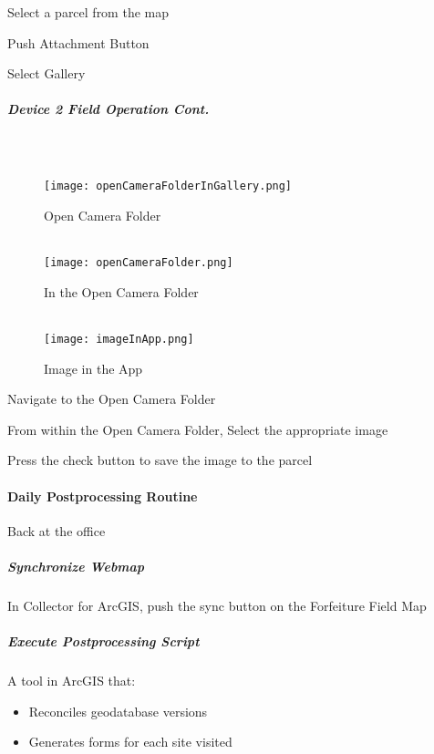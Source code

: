 \documentclass[class=article , crop=false, titlepage, twoside, multi={itemize, figure, verbatim}, float=false]{standalone}
\begin{document}
Select a parcel from the map\\
\vspace{2in}

\noindent Push Attachment Button
\vspace{2in}

\noindent Select Gallery

\clearpage
\subparagraph*{Device 2 Field Operation Cont.} 
\subparagraph*{\\}

\begin{wrapfigure}{r}{0.5\textwidth}
\centering
\texttt{[image: openCameraFolderInGallery.png]}
\caption {Open Camera Folder}
\vspace{.2in}
\HRule \\[.4cm] %
\vspace{.2in}
\texttt{[image: openCameraFolder.png]}
\caption{In the Open Camera Folder}
\vspace{.2in}
\HRule \\[.4cm] %
\vspace{.2in}
\texttt{[image: imageInApp.png]}
\caption{Image in the App}
\end{wrapfigure}
Navigate to the Open Camera Folder\\
\vspace{2in}

\noindent From within the Open Camera Folder, Select the appropriate image
\vspace{2in}

\noindent Press the check button to save the image to the parcel 

\clearpage
\paragraph{Daily Postprocessing Routine}Back at the office
\subparagraph{Synchronize Webmap}In Collector for ArcGIS, push the sync button on the Forfeiture Field Map
\subparagraph{Execute Postprocessing Script}A tool in ArcGIS that:

\begin{itemize}
\item Reconciles geodatabase versions
\item Generates forms for each site visited


\end{itemize}
\end{document}
